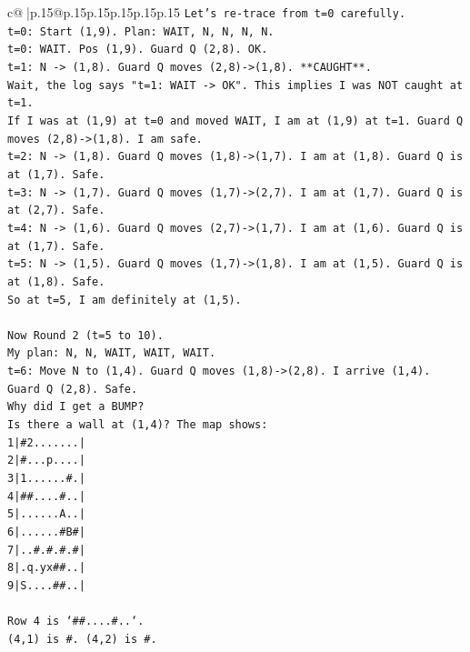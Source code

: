\documentclass{article}
\begin{document}
{\begin{supertabular}{c@{$\;$}|p{.15\linewidth}@{}p{.15\linewidth}p{.15\linewidth}p{.15\linewidth}p{.15\linewidth}p{.15\linewidth}}
{{{\texttt{Let's re{-}trace from t=0 carefully.} \\
\texttt{t=0: Start (1,9). Plan: WAIT, N, N, N, N.} \\
\texttt{t=0: WAIT. Pos (1,9). Guard Q (2,8). OK.} \\
\texttt{t=1: N {-}> (1,8). Guard Q moves (2,8){-}>(1,8). **CAUGHT**.} \\
\texttt{Wait, the log says "t=1: WAIT {-}> OK". This implies I was NOT caught at t=1.} \\
\texttt{If I was at (1,9) at t=0 and moved WAIT, I am at (1,9) at t=1. Guard Q moves (2,8){-}>(1,8). I am safe.} \\
\texttt{t=2: N {-}> (1,8). Guard Q moves (1,8){-}>(1,7). I am at (1,8). Guard Q is at (1,7). Safe.} \\
\texttt{t=3: N {-}> (1,7). Guard Q moves (1,7){-}>(2,7). I am at (1,7). Guard Q is at (2,7). Safe.} \\
\texttt{t=4: N {-}> (1,6). Guard Q moves (2,7){-}>(1,7). I am at (1,6). Guard Q is at (1,7). Safe.} \\
\texttt{t=5: N {-}> (1,5). Guard Q moves (1,7){-}>(1,8). I am at (1,5). Guard Q is at (1,8). Safe.} \\
\texttt{So at t=5, I am definitely at (1,5).} \\
\\ 
\texttt{Now Round 2 (t=5 to 10).} \\
\texttt{My plan: N, N, WAIT, WAIT, WAIT.} \\
\texttt{t=6: Move N to (1,4). Guard Q moves (1,8){-}>(2,8). I arrive (1,4). Guard Q (2,8). Safe.} \\
\texttt{Why did I get a BUMP?} \\
\texttt{Is there a wall at (1,4)? The map shows:} \\
\texttt{1|\#2.......|} \\
\texttt{2|\#...p....|} \\
\texttt{3|1......\#.|} \\
\texttt{4|\#\#....\#..|} \\
\texttt{5|......A..|} \\
\texttt{6|......\#B\#|} \\
\texttt{7|..\#.\#.\#.\#|} \\
\texttt{8|.q.yx\#\#..|} \\
\texttt{9|S....\#\#..|} \\
\\ 
\texttt{Row 4 is `\#\#....\#..`.} \\
\texttt{(4,1) is \#. (4,2) is \#.} \\
}}}
\end{supertabular}}
\end{document}
